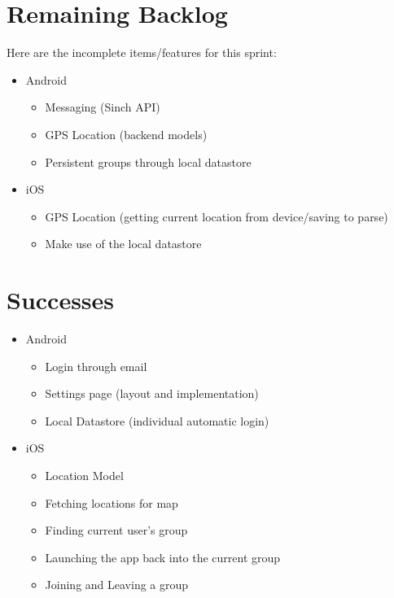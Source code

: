 \documentclass[11pt]{article}
\begin{document}
\section*{Remaining Backlog}
Here are the incomplete items/features for this sprint:
	\begin{itemize}
		\item Android
		\begin{itemize}
			\item Messaging (Sinch API)
			\item GPS Location (backend models)
			\item Persistent groups through local datastore
		\end{itemize}
		
		\item iOS 
			\begin{itemize}
			\item GPS Location (getting current location from device/saving to parse)
			\item Make use of the local datastore
			\end{itemize}
	\end{itemize}

\section*{Successes}

	\begin{itemize}
		\item Android
		\begin{itemize}
			\item Login through email
			\item Settings page (layout and implementation)
			\item Local Datastore (individual automatic login)
		\end{itemize}
		
		\item iOS
			\begin{itemize}
			\item Location Model
			\item Fetching locations for map
			\item Finding current user's group
			\item Launching the app back into the current group
			\item Joining and Leaving a group
			\end{itemize}
	\end{itemize}
\end{document}
